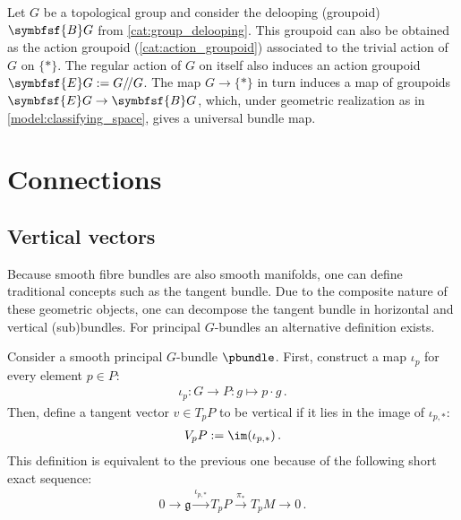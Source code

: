     \begin{construct}
        Let $G$ be a topological group and consider the delooping (groupoid) $\symbfsf{B}G$ from \cref{cat:group_delooping}. This groupoid can also be obtained as the action groupoid (\cref{cat:action_groupoid}) associated to the trivial action of $G$ on $\{\ast\}$. The regular action of $G$ on itself also induces an action groupoid $\symbfsf{E}G:=G/\!/G$. The map $G\rightarrow\{\ast\}$ in turn induces a map of groupoids $\symbfsf{E}G\rightarrow\symbfsf{B}G$, which, under geometric realization as in \cref{model:classifying_space}, gives a universal bundle map.
    \end{construct}

\section{Connections}\label{section:connections}
\subsection{Vertical vectors}

    Because smooth fibre bundles are also smooth manifolds, one can define traditional concepts such as the tangent bundle. Due to the composite nature of these geometric objects, one can decompose the tangent bundle in horizontal and vertical (sub)bundles.
    For principal $G$-bundles an alternative definition exists.
    \begin{adefinition}
        Consider a smooth principal $G$-bundle $\pbundle$. First, construct a map $\iota_p$ for every element $p\in P$:
        \begin{gather}
            \iota_p:G\rightarrow P:g\mapsto p\cdot g\,.
        \end{gather}
        Then, define a tangent vector $v\in T_pP$ to be vertical if it lies in the image of $\iota_{p,\ast}$:
        \begin{gather}
            V_pP := \im(\iota_{p,\ast})\,.
        \end{gather}
        This definition is equivalent to the previous one because of the following short exact sequence:
        \begin{gather}
            \label{bundle:principal_bundle_exact_sequence}
            0\longrightarrow\mathfrak{g}\overset{\iota_{p,\ast}}{\longrightarrow}T_pP\overset{\pi_\ast}{\longrightarrow}T_pM\longrightarrow0\,.
        \end{gather}
    \end{adefinition}

